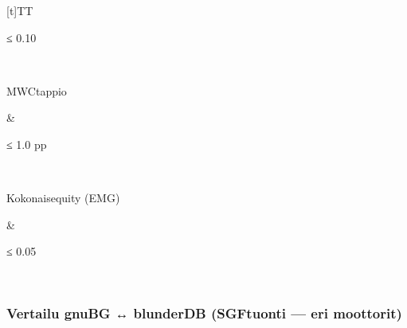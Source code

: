 \documentclass[letterpaper,10pt,finnish]{sphinxmanual}
\begin{document}
\begin{savenotes}
\begin{tabulary}{\linewidth}[t]{TT}
\begin{varwidth}[t]{}
\sphinxAtStartPar
≤ 0.10
\sphinxbeforeendvarwidth
\end{varwidth}%
\\
\sphinxhline\begin{varwidth}[t]{}
\sphinxAtStartPar
MWC\sphinxhyphen{}tappio
\sphinxbeforeendvarwidth
\end{varwidth}%
&\begin{varwidth}[t]{}
\sphinxAtStartPar
≤ 1.0 pp
\sphinxbeforeendvarwidth
\end{varwidth}%
\\
\sphinxhline\begin{varwidth}[t]{}
\sphinxAtStartPar
Kokonaisequity (EMG)
\sphinxbeforeendvarwidth
\end{varwidth}%
&\begin{varwidth}[t]{}
\sphinxAtStartPar
≤ 0.05
\sphinxbeforeendvarwidth
\end{varwidth}%
\\
\sphinxbottomrule
\end{tabulary}
\sphinxtableafterendhook\par
\sphinxattableend\end{savenotes}


\subsubsection{Vertailu gnuBG ↔ blunderDB (SGF\sphinxhyphen{}tuonti — eri moottorit)}
\label{\detokenize{stats_parity:comparaison-gnubg-blunderdb-import-sgf-moteurs-differents}}
\end{document}

